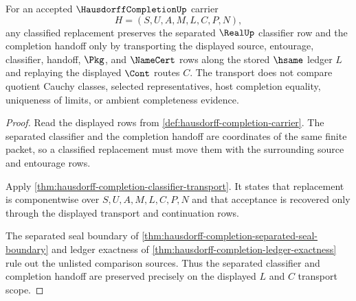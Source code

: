 \begin{theorem}
\label{thm:hausdorffcompletion-separated-ledger-transport-scope}
For an accepted $\HausdorffCompletionUp$ carrier
$$
H=(S,U,A,M,L,C,P,N),
$$
any classified replacement preserves the separated $\RealUp$ classifier row and the completion handoff only by transporting the displayed source, entourage, classifier, handoff, $\Pkg$, and $\NameCert$ rows along the stored $\hsame$ ledger $L$ and replaying the displayed $\Cont$ routes $C$. The transport does not compare quotient Cauchy classes, selected representatives, host completion equality, uniqueness of limits, or ambient completeness evidence.
\end{theorem}
\begin{proof}
Read the displayed rows from \autoref{def:hausdorff-completion-carrier}. The separated classifier and the completion handoff are coordinates of the same finite packet, so a classified replacement must move them with the surrounding source and entourage rows.

Apply \autoref{thm:hausdorff-completion-classifier-transport}. It states that replacement is componentwise over $S,U,A,M,L,C,P,N$ and that acceptance is recovered only through the displayed transport and continuation rows.

The separated seal boundary of \autoref{thm:hausdorff-completion-separated-seal-boundary} and ledger exactness of \autoref{thm:hausdorff-completion-ledger-exactness} rule out the unlisted comparison sources. Thus the separated classifier and completion handoff are preserved precisely on the displayed $L$ and $C$ transport scope.
\end{proof}

